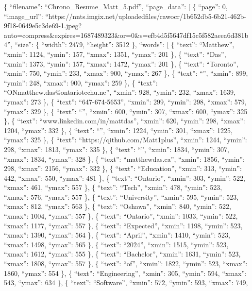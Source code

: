 \documentclass[
]{article}
\author{}
\date{}
\begin{document}
\{ ``filename'': ``Chrono\_Resume\_Matt\_5.pdf'', ``page\_data'': {[} \{
``page'': 0, ``image\_url'':
``https://nnts.imgix.net/uploadedfiles/rawocr/1b652db5-6b21-462b-9f18-0649e5c3de69-1.jpeg?auto=compress\&expires=1687489323\&or=0\&s=efb4d5f5647df15c5f582aeea6d381b4'',
``size'': \{ ``width'': 2479, ``height'': 3512 \}, ``words'': {[} \{
``text'': ``Matthew'', ``xmin'': 1124, ``ymin'': 157, ``xmax'': 1351,
``ymax'': 201 \}, \{ ``text'': ``Das'', ``xmin'': 1373, ``ymin'': 157,
``xmax'': 1472, ``ymax'': 201 \}, \{ ``text'': ``Toronto'', ``xmin'':
750, ``ymin'': 233, ``xmax'': 900, ``ymax'': 267 \}, \{ ``text'':
``\textbar{}'', ``xmin'': 899, ``ymin'': 248, ``xmax'': 900, ``ymax'':
259 \}, \{ ``text'': ``ONmatthew.das@ontariotechu.ne'', ``xmin'': 928,
``ymin'': 232, ``xmax'': 1639, ``ymax'': 273 \}, \{ ``text'':
``647-674-5653'', ``xmin'': 299, ``ymin'': 298, ``xmax'': 579, ``ymax'':
329 \}, \{ ``text'': ``\textbar{}'', ``xmin'': 600, ``ymin'': 307,
``xmax'': 600, ``ymax'': 325 \}, \{ ``text'':
``www.linkedin.com/in/mattdas'', ``xmin'': 620, ``ymin'': 298, ``xmax'':
1204, ``ymax'': 332 \}, \{ ``text'': ``\textbar{}'', ``xmin'': 1224,
``ymin'': 301, ``xmax'': 1225, ``ymax'': 325 \}, \{ ``text'':
``https://qithub.com/Matt1plus'', ``xmin'': 1244, ``ymin'': 298,
``xmax'': 1813, ``ymax'': 335 \}, \{ ``text'': ``\textbar{}'', ``xmin'':
1834, ``ymin'': 307, ``xmax'': 1834, ``ymax'': 328 \}, \{ ``text'':
``matthewdas.ca'', ``xmin'': 1856, ``ymin'': 298, ``xmax'': 2156,
``ymax'': 332 \}, \{ ``text'': ``Education'', ``xmin'': 313, ``ymin'':
442, ``xmax'': 550, ``ymax'': 481 \}, \{ ``text'': ``Ontario'',
``xmin'': 303, ``ymin'': 522, ``xmax'': 461, ``ymax'': 557 \}, \{
``text'': ``Tech'', ``xmin'': 478, ``ymin'': 523, ``xmax'': 576,
``ymax'': 557 \}, \{ ``text'': ``University'', ``xmin'': 595, ``ymin'':
523, ``xmax'': 812, ``ymax'': 563 \}, \{ ``text'': ``Oshawa'', ``xmin'':
840, ``ymin'': 522, ``xmax'': 1004, ``ymax'': 557 \}, \{ ``text'':
``Ontario'', ``xmin'': 1033, ``ymin'': 522, ``xmax'': 1177, ``ymax'':
557 \}, \{ ``text'': ``Expected'', ``xmin'': 1198, ``ymin'': 523,
``xmax'': 1390, ``ymax'': 564 \}, \{ ``text'': ``April'', ``xmin'':
1410, ``ymin'': 523, ``xmax'': 1498, ``ymax'': 565 \}, \{ ``text'':
``2024'', ``xmin'': 1515, ``ymin'': 523, ``xmax'': 1612, ``ymax'': 555
\}, \{ ``text'': ``Bachelor'', ``xmin'': 1631, ``ymin'': 523, ``xmax'':
1808, ``ymax'': 557 \}, \{ ``text'': ``of'', ``xmin'': 1822, ``ymin'':
523, ``xmax'': 1860, ``ymax'': 554 \}, \{ ``text'': ``Engineering'',
``xmin'': 305, ``ymin'': 594, ``xmax'': 543, ``ymax'': 634 \}, \{
``text'': ``Software'', ``xmin'': 572, ``ymin'': 593, ``xmax'': 749,
\end{document}
